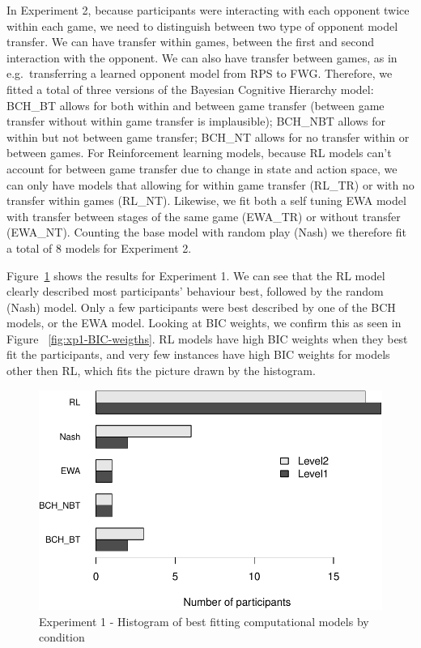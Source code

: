 \documentclass[
  english,
  man,floatsintext]{apa6}
\begin{document}
In Experiment 2, because participants were interacting with each opponent twice within each game, we need to distinguish between two type of opponent model transfer. We can have transfer within games, between the first and second interaction with the opponent. We can also have transfer between games, as in e.g.~transferring a learned opponent model from RPS to FWG. Therefore, we fitted a total of three versions of the Bayesian Cognitive Hierarchy model: BCH\_BT allows for both within and between game transfer (between game transfer without within game transfer is implausible); BCH\_NBT allows for within but not between game transfer; BCH\_NT allows for no transfer within or between games. For Reinforcement learning models, because RL models can't account for between game transfer due to change in state and action space, we can only have models that allowing for within game transfer (RL\_TR) or with no transfer within games (RL\_NT). Likewise, we fit both a self tuning EWA model with transfer between stages of the same game (EWA\_TR) or without transfer (EWA\_NT). Counting the base model with random play (Nash) we therefore fit a total of 8 models for Experiment 2.

Figure~\ref{fig:exp1-comp-models} shows the results for Experiment 1. We can see that the RL model clearly described most participants' behaviour best, followed by the random (Nash) model. Only a few participants were best described by one of the BCH models, or the EWA model. Looking at BIC weights, we confirm this as seen in Figure ~\ref{fig:xp1-BIC-weigths}. RL models have high BIC weights when they best fit the participants, and very few instances have high BIC weights for models other then RL, which fits the picture drawn by the histogram.

\begin{figure}

{\centering \includegraphics[width=\textwidth]{paper_draft_2021_files/figure-latex/exp1-comp-models-1} 

}

\caption{Experiment 1 - Histogram of best fitting computational models by condition}\label{fig:exp1-comp-models}
\end{figure}
\end{document}
